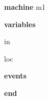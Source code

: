 \begin{block}
  \item   \textbf{machine} m1
  \item   \textbf{variables}
  \begin{block}
    \item   in
    \item   loc
  \end{block}
  \item   
  \item   
  \item   
  \item   
  \item   \textbf{events}
  \begin{block}
    \item   
    \item   
    \item   
    \item   
  \end{block}
  \item   \textbf{end} \\
\end{block}
